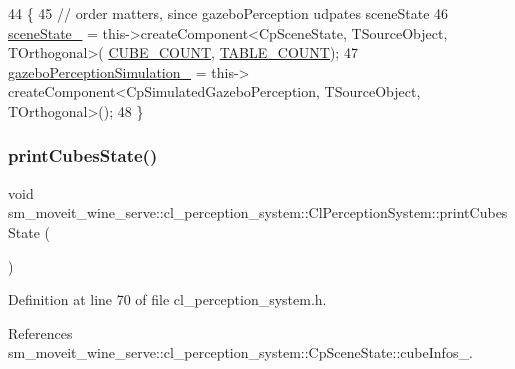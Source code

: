 \begin{DoxyCode}
44             \{
45                 \textcolor{comment}{// order matters, since gazeboPerception udpates sceneState}
46                 \hyperlink{classsm__moveit__wine__serve_1_1cl__perception__system_1_1ClPerceptionSystem_addfd893a6f290ffc73d7f55cce9e637b}{sceneState\_} = this->createComponent<CpSceneState, TSourceObject, TOrthogonal>(
      \hyperlink{namespacesm__moveit__wine__serve_ac6a021cad03473894d9b5adfd589f49b}{CUBE\_COUNT}, \hyperlink{namespacesm__moveit__wine__serve_adaca9c235c0d76019ef6ff08dd32977c}{TABLE\_COUNT});
47                 \hyperlink{classsm__moveit__wine__serve_1_1cl__perception__system_1_1ClPerceptionSystem_a91db49d22e40d2efaa29a9d18c61d7da}{gazeboPerceptionSimulation\_} = this->
      createComponent<CpSimulatedGazeboPerception, TSourceObject, TOrthogonal>();
48             \}
\end{DoxyCode}
\mbox{\label{classsm__moveit__wine__serve_1_1cl__perception__system_1_1ClPerceptionSystem_a873b77957bc9fb25dba500389911ff0c}} 
\subsubsection{\texorpdfstring{print\+Cubes\+State()}{printCubesState()}}
{\footnotesize\ttfamily void sm\+\_\+moveit\+\_\+wine\+\_\+serve\+::cl\+\_\+perception\+\_\+system\+::\+Cl\+Perception\+System\+::print\+Cubes\+State (\begin{DoxyParamCaption}{ }\end{DoxyParamCaption})\hspace{0.3cm}{\ttfamily [inline]}}



Definition at line 70 of file cl\+\_\+perception\+\_\+system.\+h.



References sm\+\_\+moveit\+\_\+wine\+\_\+serve\+::cl\+\_\+perception\+\_\+system\+::\+Cp\+Scene\+State\+::cube\+Infos\+\_\+.


